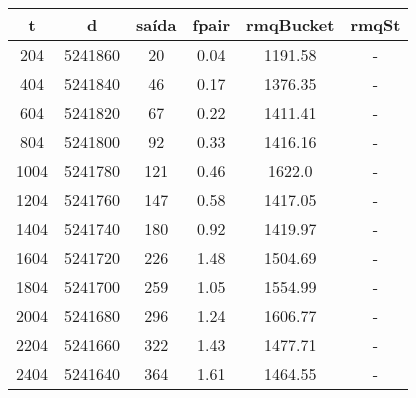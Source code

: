 \begin{tabular}{|c|c|c|c|c|c|}
\hline
\textbf{t} & \textbf{d} & \textbf{saída} & \textbf{fpair} & \textbf{rmqBucket} & \textbf{rmqSt}\\
\hline
204 & 5241860 & 20 & 0.04 & 1191.58 & -\\
\hline
404 & 5241840 & 46 & 0.17 & 1376.35 & -\\
\hline
604 & 5241820 & 67 & 0.22 & 1411.41 & -\\
\hline
804 & 5241800 & 92 & 0.33 & 1416.16 & -\\
\hline
1004 & 5241780 & 121 & 0.46 & 1622.0 & -\\
\hline
1204 & 5241760 & 147 & 0.58 & 1417.05 & -\\
\hline
1404 & 5241740 & 180 & 0.92 & 1419.97 & -\\
\hline
1604 & 5241720 & 226 & 1.48 & 1504.69 & -\\
\hline
1804 & 5241700 & 259 & 1.05 & 1554.99 & -\\
\hline
2004 & 5241680 & 296 & 1.24 & 1606.77 & -\\
\hline
2204 & 5241660 & 322 & 1.43 & 1477.71 & -\\
\hline
2404 & 5241640 & 364 & 1.61 & 1464.55 & -\\
\hline
\end{tabular}
